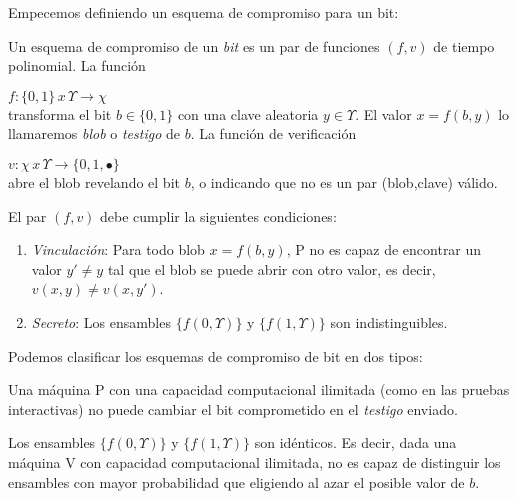 Empecemos definiendo un esquema de compromiso para un bit:


\begin{definition}\label{commit:def}
	Un esquema de compromiso de un \textit{bit} es un par de funciones $(f,v)$ de tiempo polinomial. La función
	
	$
	f:\{0,1\}\, x\, \Upsilon \to \chi
	$
	\\transforma el bit $b\in \{0,1\}$ con una clave aleatoria $y\in \Upsilon$. El valor $x=f(b,y)$ lo llamaremos \textit{blob} o \textit{testigo} de $b$. La función de verificación
	
	$
	v:\chi \, x \, \Upsilon \to \{0,1,\bullet\}
	$
	\\abre el blob revelando el bit $b$, o indicando que no es un par (blob,clave) válido.
	
	El par $(f,v)$ debe cumplir la siguientes condiciones:
	\begin{enumerate}
		\item \textit{Vinculación}: Para todo blob $x=f(b,y)$, P no es capaz de encontrar un valor $y' \neq y$ tal que el blob se puede abrir con otro valor, es decir, $v(x,y) \neq v(x,y')$.
		
		\item \textit{Secreto}: Los ensambles $\{f(0,\Upsilon)\}$ y $\{f(1,\Upsilon)\}$ son indistinguibles.
	\end{enumerate}
	
\end{definition}

\hfil

Podemos clasificar los esquemas de compromiso de bit en dos tipos:

\begin{definition}
	Una máquina P con una capacidad computacional ilimitada (como en las pruebas interactivas) no puede cambiar el bit comprometido en el \textit{testigo} enviado.
\end{definition}

\begin{definition}
	Los ensambles $\{f(0,\Upsilon)\}$ y $\{f(1,\Upsilon)\}$ son idénticos. Es decir, dada una máquina V con capacidad computacional ilimitada, no es capaz de distinguir los ensambles con mayor probabilidad que eligiendo al azar el posible valor de $b$.
\end{definition}

